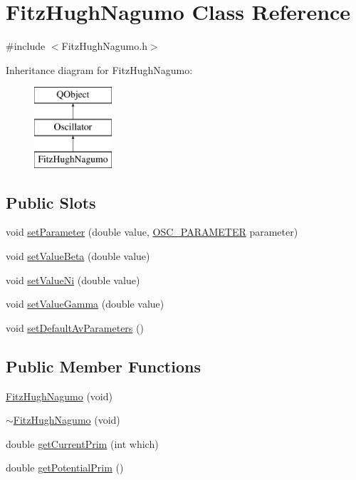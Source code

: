 \hypertarget{class_fitz_hugh_nagumo}{\section{Fitz\+Hugh\+Nagumo Class Reference}
\label{class_fitz_hugh_nagumo}
}


{\ttfamily \#include $<$Fitz\+Hugh\+Nagumo.\+h$>$}

Inheritance diagram for Fitz\+Hugh\+Nagumo\+:\begin{figure}[H]
\begin{center}
\leavevmode
\includegraphics[height=3.000000cm]{class_fitz_hugh_nagumo}
\end{center}
\end{figure}
\subsection*{Public Slots}
\begin{DoxyCompactItemize}
\item 
void \hyperlink{class_fitz_hugh_nagumo_ab1f3c9104230b052ec30096d11dd23b0}{set\+Parameter} (double value, \hyperlink{heart_defines_8h_a79395aba577c2bc57e7ca211ff3476a6}{O\+S\+C\+\_\+\+P\+A\+R\+A\+M\+E\+T\+E\+R} parameter)
\item 
void \hyperlink{class_fitz_hugh_nagumo_a9db9c3133f8f1e3d92f98fc0b1554dac}{set\+Value\+Beta} (double value)
\item 
void \hyperlink{class_fitz_hugh_nagumo_a07d74fdae4fc391eb5d8a3aca7088746}{set\+Value\+Ni} (double value)
\item 
void \hyperlink{class_fitz_hugh_nagumo_a10c8d7c96fe39b0a2b7151092776f6f2}{set\+Value\+Gamma} (double value)
\item 
void \hyperlink{class_fitz_hugh_nagumo_ac1f73cfe6263e8561dc1ddae91819e38}{set\+Default\+Av\+Parameters} ()
\end{DoxyCompactItemize}
\subsection*{Public Member Functions}
\begin{DoxyCompactItemize}
\item 
\hyperlink{class_fitz_hugh_nagumo_a2c8d3d7f70371091eadeab6ce0873404}{Fitz\+Hugh\+Nagumo} (void)
\item 
\hyperlink{class_fitz_hugh_nagumo_a1bc8c62851f3b2306b403ea65f9034ca}{$\sim$\+Fitz\+Hugh\+Nagumo} (void)
\item 
double \hyperlink{class_fitz_hugh_nagumo_a2d09bc9358d92d29c3c403af7f4b33d8}{get\+Current\+Prim} (int which)
\item 
double \hyperlink{class_fitz_hugh_nagumo_ae4d4e8c1c3b9905a0e6aaa5ae0c2f2ed}{get\+Potential\+Prim} ()
\end{DoxyCompactItemize}
